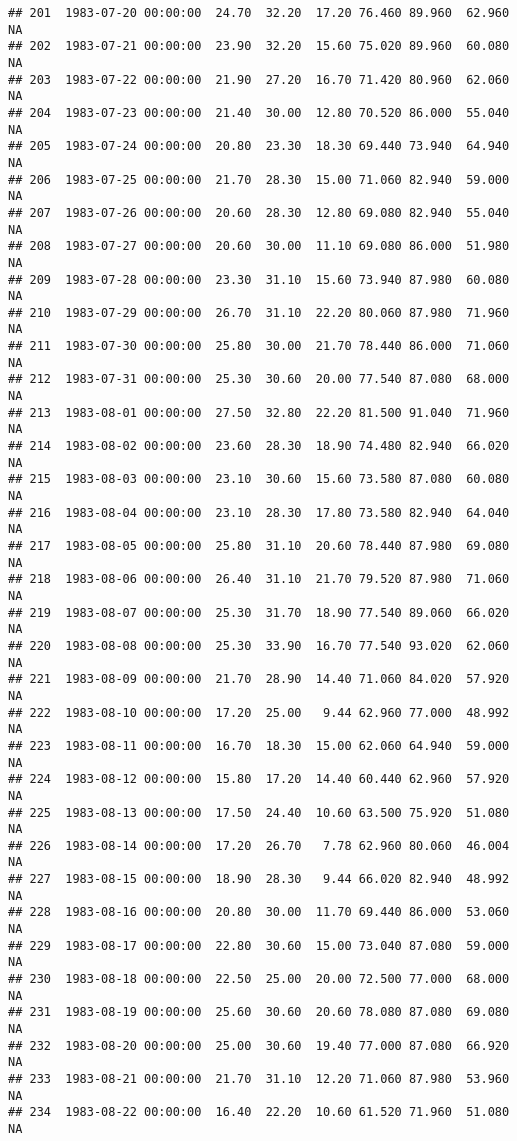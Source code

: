 \documentclass{article}\usepackage{graphicx, color}
\makeatletter
\newenvironment{kframe}{%
 \def\at@end@of@kframe{}%
 \ifinner\ifhmode%
  \def\at@end@of@kframe{\end{minipage}}%
  \begin{minipage}{\columnwidth}%
 \fi\fi%
 \def\FrameCommand##1{\hskip\@totalleftmargin \hskip-\fboxsep
 \colorbox{shadecolor}{##1}\hskip-\fboxsep
     \hskip-\linewidth \hskip-\@totalleftmargin \hskip\columnwidth}%
 \MakeFramed {\advance\hsize-\width
   \@totalleftmargin\z@ \linewidth\hsize
   \@setminipage}}%
 {\par\unskip\endMakeFramed%
 \at@end@of@kframe}
\newenvironment{knitrout}{}{} %
\makeatother
\begin{document}
\begin{knitrout}
\begin{kframe}
\begin{verbatim}
## 201  1983-07-20 00:00:00  24.70  32.20  17.20 76.460 89.960  62.960     NA
## 202  1983-07-21 00:00:00  23.90  32.20  15.60 75.020 89.960  60.080     NA
## 203  1983-07-22 00:00:00  21.90  27.20  16.70 71.420 80.960  62.060     NA
## 204  1983-07-23 00:00:00  21.40  30.00  12.80 70.520 86.000  55.040     NA
## 205  1983-07-24 00:00:00  20.80  23.30  18.30 69.440 73.940  64.940     NA
## 206  1983-07-25 00:00:00  21.70  28.30  15.00 71.060 82.940  59.000     NA
## 207  1983-07-26 00:00:00  20.60  28.30  12.80 69.080 82.940  55.040     NA
## 208  1983-07-27 00:00:00  20.60  30.00  11.10 69.080 86.000  51.980     NA
## 209  1983-07-28 00:00:00  23.30  31.10  15.60 73.940 87.980  60.080     NA
## 210  1983-07-29 00:00:00  26.70  31.10  22.20 80.060 87.980  71.960     NA
## 211  1983-07-30 00:00:00  25.80  30.00  21.70 78.440 86.000  71.060     NA
## 212  1983-07-31 00:00:00  25.30  30.60  20.00 77.540 87.080  68.000     NA
## 213  1983-08-01 00:00:00  27.50  32.80  22.20 81.500 91.040  71.960     NA
## 214  1983-08-02 00:00:00  23.60  28.30  18.90 74.480 82.940  66.020     NA
## 215  1983-08-03 00:00:00  23.10  30.60  15.60 73.580 87.080  60.080     NA
## 216  1983-08-04 00:00:00  23.10  28.30  17.80 73.580 82.940  64.040     NA
## 217  1983-08-05 00:00:00  25.80  31.10  20.60 78.440 87.980  69.080     NA
## 218  1983-08-06 00:00:00  26.40  31.10  21.70 79.520 87.980  71.060     NA
## 219  1983-08-07 00:00:00  25.30  31.70  18.90 77.540 89.060  66.020     NA
## 220  1983-08-08 00:00:00  25.30  33.90  16.70 77.540 93.020  62.060     NA
## 221  1983-08-09 00:00:00  21.70  28.90  14.40 71.060 84.020  57.920     NA
## 222  1983-08-10 00:00:00  17.20  25.00   9.44 62.960 77.000  48.992     NA
## 223  1983-08-11 00:00:00  16.70  18.30  15.00 62.060 64.940  59.000     NA
## 224  1983-08-12 00:00:00  15.80  17.20  14.40 60.440 62.960  57.920     NA
## 225  1983-08-13 00:00:00  17.50  24.40  10.60 63.500 75.920  51.080     NA
## 226  1983-08-14 00:00:00  17.20  26.70   7.78 62.960 80.060  46.004     NA
## 227  1983-08-15 00:00:00  18.90  28.30   9.44 66.020 82.940  48.992     NA
## 228  1983-08-16 00:00:00  20.80  30.00  11.70 69.440 86.000  53.060     NA
## 229  1983-08-17 00:00:00  22.80  30.60  15.00 73.040 87.080  59.000     NA
## 230  1983-08-18 00:00:00  22.50  25.00  20.00 72.500 77.000  68.000     NA
## 231  1983-08-19 00:00:00  25.60  30.60  20.60 78.080 87.080  69.080     NA
## 232  1983-08-20 00:00:00  25.00  30.60  19.40 77.000 87.080  66.920     NA
## 233  1983-08-21 00:00:00  21.70  31.10  12.20 71.060 87.980  53.960     NA
## 234  1983-08-22 00:00:00  16.40  22.20  10.60 61.520 71.960  51.080     NA

\end{verbatim}
\end{kframe}
\end{knitrout}
\end{document}
